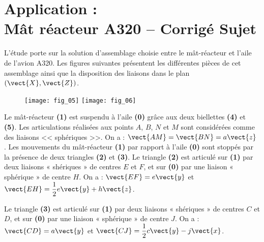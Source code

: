 \chapter*{Application  :\\ 
Mât réacteur A320 -- \ifprof Corrigé \else Sujet \fi}

\iflivret {} \else
\ifprof  {} \else \fi
\fi

\setcounter{question}{0}


 L’étude porte sur la solution d’assemblage choisie entre le mât-réacteur et l’aile de l’avion A320. Les figures suivantes présentent les différentes pièces de cet assemblage ainsi que la disposition des liaisons dans le plan $(\vect{X}, \vect{Z})$.
 
 
\begin{figure*}[!h]
\texttt{[image: fig\_05]}
\texttt{[image: fig\_06]}
\end{figure*}

Le mât-réacteur \textbf{(1)} est suspendu à l’aile \textbf{(0)} grâce aux deux biellettes \textbf{(4)} et \textbf{(5)}.
Les articulations réalisées aux points $A$, $B$, $N$ et $M$ sont considérées comme des liaisons << sphériques >>. On a : $\vect{AM}=\vect{BN}=a\vect{z}$ .
Les mouvements du mât-réacteur \textbf{(1)} par rapport à l’aile \textbf{(0)} sont stoppés par la présence de deux triangles \textbf{(2)} et \textbf{(3)}. Le triangle \textbf{(2)} est articulé sur \textbf{(1)} par deux liaisons « shériques » de centres $E$ et $F$, et sur \textbf{(0)} par une liaison « sphérique » de centre $H$. On a : $\vect{EF}=e\vect{y}$ et $\vect{EH}=\dfrac{1}{2}e\vect{y}+h\vect{z}$.

Le triangle \textbf{(3)} est articulé sur \textbf{(1)} par deux liaisons « shériques » de centres $C$ et $D$, et sur \textbf{(0)} par une liaison « sphérique » de centre $J$. On a : $\vect{CD}=a\vect{y}$  et  $\vect{CJ}=\dfrac{1}{2}c\vect{y}-j\vect{x}$.



